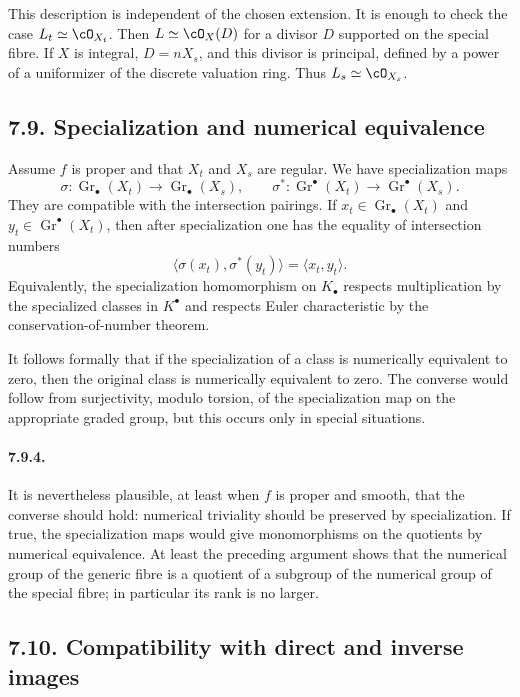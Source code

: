 \documentclass[11pt]{article}
\theoremstyle{plain}
\theoremstyle{definition}
\theoremstyle{remark}
\DeclareMathOperator{\Gr}{Gr}
\newcommand{\longto}{\longrightarrow}
\begin{document}
This description is independent of the chosen extension. It is enough to check the case $L_t\simeq\cO_{X_t}$. Then $L\simeq\cO_X(D)$ for a divisor $D$ supported on the special fibre. If $X$ is integral, $D=nX_s$, and this divisor is principal, defined by a power of a uniformizer of the discrete valuation ring. Thus $L_s\simeq\cO_{X_s}$.

\subsection*{7.9. Specialization and numerical equivalence}

Assume $f$ is proper and that $X_t$ and $X_s$ are regular. We have specialization maps
\[
\sigma:\Gr_\bullet(X_t)\longto\Gr_\bullet(X_s),
\qquad
\sigma^*:\Gr^\bullet(X_t)\longto\Gr^\bullet(X_s).
\]
They are compatible with the intersection pairings. If $x_t\in\Gr_\bullet(X_t)$ and $y_t\in\Gr^\bullet(X_t)$, then after specialization one has the equality of intersection numbers
\[
\langle \sigma(x_t),\sigma^*(y_t)\rangle
=
\langle x_t,y_t\rangle.
\]
Equivalently, the specialization homomorphism on $K_\bullet$ respects multiplication by the specialized classes in $K^\bullet$ and respects Euler characteristic by the conservation-of-number theorem.

It follows formally that if the specialization of a class is numerically equivalent to zero, then the original class is numerically equivalent to zero. The converse would follow from surjectivity, modulo torsion, of the specialization map on the appropriate graded group, but this occurs only in special situations.

\paragraph{7.9.4.}
It is nevertheless plausible, at least when $f$ is proper and smooth, that the converse should hold: numerical triviality should be preserved by specialization. If true, the specialization maps would give monomorphisms on the quotients by numerical equivalence. At least the preceding argument shows that the numerical group of the generic fibre is a quotient of a subgroup of the numerical group of the special fibre; in particular its rank is no larger.

\subsection*{7.10. Compatibility with direct and inverse images}
\end{document}
